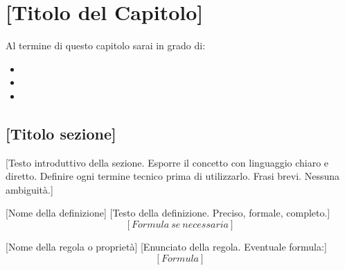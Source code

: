 %

\chapter{[Titolo del Capitolo]}
\label{cap:[etichetta]}

\begin{tcolorbox}[
    colback  = gray!6,
    colframe = colorePrimario,
    arc      = 4pt,
    title    = {\bfseries\color{colorePrimario} Obiettivi di apprendimento},
    fonttitle = \bfseries
]
Al termine di questo capitolo sarai in grado di:
\begin{itemize}
    \item [Obiettivo 1]
    \item [Obiettivo 2]
    \item [Obiettivo 3]
\end{itemize}
\end{tcolorbox}

\spazio

\section{[Titolo sezione]}
\label{sec:[etichetta]}

[Testo introduttivo della sezione. Esporre il concetto con linguaggio
chiaro e diretto. Definire ogni termine tecnico prima di utilizzarlo.
Frasi brevi. Nessuna ambiguità.]

\begin{definizionesemplice}{[Nome della definizione]}
    [Testo della definizione. Preciso, formale, completo.]
    \[
        [Formula\ se\ necessaria]
    \]
\end{definizionesemplice}

\spazio

\begin{regola}{[Nome della regola o proprietà]}
    [Enunciato della regola. Eventuale formula:]
    \[
        [Formula]
    \]
\end{regola}

